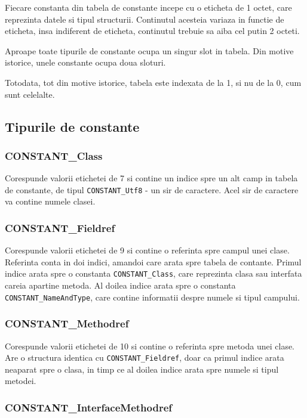 Fiecare constanta din tabela de constante incepe cu o eticheta de 1
octet, care reprezinta datele si tipul structurii. Continutul acesteia
variaza in functie de eticheta, insa indiferent de eticheta, continutul
trebuie sa aiba cel putin 2 octeti.

Aproape toate tipurile de constante ocupa un singur slot in tabela.
Din motive istorice, unele constante ocupa doua sloturi.

Totodata, tot din motive istorice, tabela este indexata de la 1, si nu
de la 0, cum sunt celelalte.

\subsection{Tipurile de constante}

\subsubsection{CONSTANT\_Class}

Corespunde valorii etichetei de 7 si contine un indice spre un alt camp
in tabela de constante, de tipul \texttt{CONSTANT\_Utf8} - un sir de
caractere. Acel sir de caractere va contine numele clasei.

\subsubsection{CONSTANT\_Fieldref}

Corespunde valorii etichetei de 9 si contine o referinta spre campul
unei clase. Referinta conta in doi indici, amandoi care arata spre
tabela de contante. Primul indice arata spre o constanta
\texttt{CONSTANT\_Class}, care reprezinta clasa sau interfata careia
apartine metoda. Al doilea indice arata spre o constanta
\texttt{CONSTANT\_NameAndType}, care contine informatii despre numele si
tipul campului.

\subsubsection{CONSTANT\_Methodref}

Corespunde valorii etichetei de 10 si contine o referinta spre metoda
unei clase. Are o structura identica cu \texttt{CONSTANT\_Fieldref},
doar ca primul indice arata neaparat spre o clasa, in timp ce al doilea
indice arata spre numele si tipul metodei.

\subsubsection{CONSTANT\_InterfaceMethodref}

